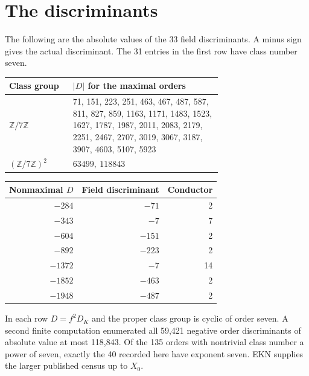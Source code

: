 \documentclass[11pt]{article}
\newcommand{\Z}{\mathbb Z}
\newcommand{\base}{X_0}
\begin{document}
\newpage
\section*{The discriminants}
The following are the absolute values of the 33 field discriminants. A
minus sign gives the actual discriminant. The 31 entries in the first row
have class number seven.
\begin{center}
\begin{tabular}{lp{0.70\linewidth}}\toprule
Class group & $|D|$ for the maximal orders\\\midrule
$\Z/7\Z$ & 71, 151, 223, 251, 463, 467, 487, 587, 811, 827, 859, 1163, 1171, 1483, 1523, 1627, 1787, 1987, 2011, 2083, 2179, 2251, 2467, 2707, 3019, 3067, 3187, 3907, 4603, 5107, 5923 \\[3pt]
$(\Z/7\Z)^2$ & $63499,\ 118843$ \\\bottomrule
\end{tabular}
\end{center}
\begin{center}
\begin{tabular}{rrr}\toprule
Nonmaximal $D$ & Field discriminant & Conductor\\\midrule
$-284$ & $-71$ &2\\
$-343$ & $-7$ &7\\
$-604$ & $-151$ &2\\
$-892$ & $-223$ &2\\
$-1372$ & $-7$ &14\\
$-1852$ & $-463$ &2\\
$-1948$ & $-487$ &2\\\bottomrule
\end{tabular}
\end{center}
In each row $D=f^2 D_K$ and the proper class group is cyclic of order
seven. A second finite computation enumerated all 59,421 negative order
discriminants of absolute value at most 118,843. Of the 135 orders with
nontrivial class number a power of seven, exactly the 40 recorded here have
exponent seven. EKN supplies the larger published census up to $\base$.
\end{document}
